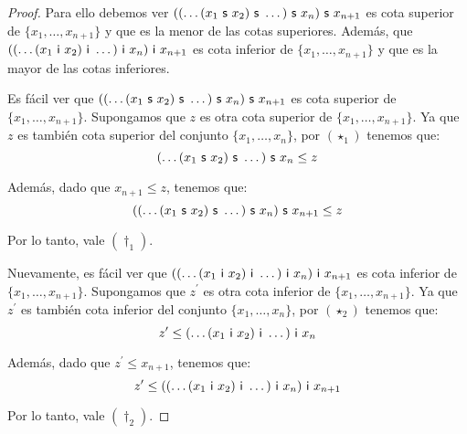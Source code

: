 \begin{proof}
    \PN Para ello debemos ver $((\dotsc(x_{1} \ \SU \ x_{2}) \ \SU \ \dotsc) \ \SU \ x_{n}) \ \SU \ x_{n+1}$ es cota
    superior de $\{x_{1}, \dotsc, x_{n+1}\}$ y que es la menor de las cotas superiores. Además, que $((\dotsc(x_{1} \
    \mathsf{i} \ x_{2}) \ \mathsf{i} \ \dotsc) \ \mathsf{i} \ x_{n}) \ \mathsf{i} \ x_{n+1}$ es cota inferior de $\{x_{1}, \dotsc, x_{n+1}\}$ y que
    es la mayor de las cotas inferiores.

    \vspace{5mm}
    \PN Es fácil ver que $((\dotsc(x_{1} \ \SU \ x_{2}) \ \SU \ \dotsc) \ \SU \ x_{n}) \ \SU \ x_{n+1}$ es cota superior
    de $ \{x_{1}, \dotsc, x_{n+1}\}$. Supongamos que $z$ es otra cota superior de $\{x_{1}, \dotsc, x_{n+1}\}$. Ya que
    $z$ es también cota superior del conjunto $\{x_{1}, \dotsc, x_{n}\}$, por $(\star_{1})$ tenemos que:
    \[
      (\dotsc (x_{1} \ \mathsf{s} \ x_{2}) \ \mathsf{s} \ \dotsc) \ \mathsf{s} \ x_{n} \leq z
    \]

    \PN Además, dado que $x_{n+1} \leq z$, tenemos que:
    \[
      ((\dotsc (x_{1} \ \mathsf{s} \ x_{2}) \ \mathsf{s} \ \dotsc) \ \mathsf{s} \ x_{n}) \ \mathsf{s} \ x_{n+1} \leq z
    \]

    \PN Por lo tanto, vale $(\dag_{1})$.

    \vspace{5mm}
    \PN Nuevamente, es fácil ver que $((\dotsc(x_{1} \ \mathsf{i} \ x_{2}) \ \mathsf{i} \ \dotsc) \ \mathsf{i} \ x_{n}) \ \mathsf{i} \ x_{n+1}$ es
    cota inferior de $ \{x_{1}, \dotsc, x_{n+1}\}$. Supongamos que $z^{\prime}$ es otra cota inferior de $\{x_{1},
    \dotsc, x_{n+1}\}$. Ya que $z^{\prime}$ es también cota inferior del conjunto $\{x_{1}, \dotsc, x_{n}\}$, por
    $(\star_{2})$ tenemos que:
    \[
      z^{\prime} \leq (\dotsc (x_{1} \ \mathsf{i} \ x_{2}) \ \mathsf{i} \ \dotsc) \ \mathsf{i} \ x_{n}
    \]

    \PN Además, dado que $z^{\prime} \leq x_{n+1}$, tenemos que:
    \[
      z^{\prime} \leq ((\dotsc (x_{1} \ \IN \ x_{2}) \ \IN \ \dotsc) \ \IN \ x_{n}) \ \IN \ x_{n+1}
    \]

    \PN Por lo tanto, vale $(\dag_{2})$.
  \end{proof}

